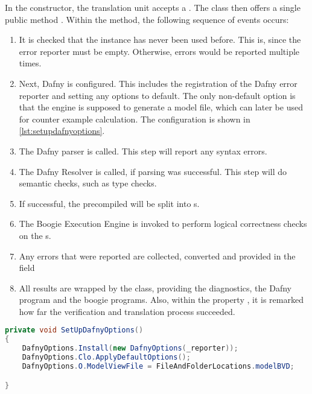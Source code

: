 In the constructor, the translation unit accepts a .
The class then offers a single public method .
Within the method, the following sequence of events occurs:
\begin{enumerate}
    \item It is checked that the instance has never been used before.
    This is, since the error reporter must be empty.
    Otherwise, errors would be reported multiple times.
    \item Next, Dafny is configured.
    This includes the registration of the Dafny error reporter and setting any options to default.
    The only non-default option is that the engine is supposed to generate a model file, which can later be used for counter example calculation.
    The configuration is shown in \ref{lst:setupdafnyoptions}.
    \item The Dafny parser is called.
    This step will report any syntax errors.
    \item The Dafny Resolver is called, if parsing was successful.
    This step will do semantic checks, such as type checks.
    \item If successful, the precompiled  will be split into s.
    \item The Boogie Execution Engine is invoked to perform logical correctness checks on the s.
    \item Any errors that were reported are collected, converted and provided in the field 
    \item All results are wrapped by the  class, providing the diagnostics, the Dafny program and the boogie programs.
    Also, within the property , it is remarked how far the verification and translation process succeeded.
\end{enumerate}




\begin{lstlisting}[language=csharp, caption={Setting up Dafny Options}, captionpos=b, label={lst:setupdafnyoptions}]
private void SetUpDafnyOptions()
{
    DafnyOptions.Install(new DafnyOptions(_reporter));
    DafnyOptions.Clo.ApplyDefaultOptions();
    DafnyOptions.O.ModelViewFile = FileAndFolderLocations.modelBVD;

}
\end{lstlisting}


